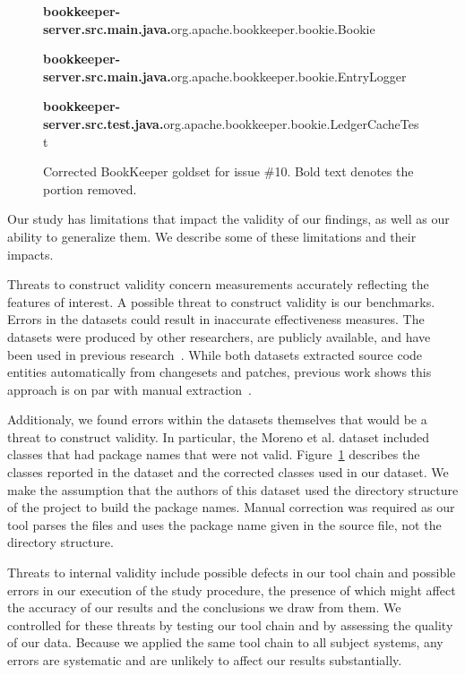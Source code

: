 

\begin{figure}[t]
\footnotesize

{\bf bookkeeper-server.src.main.java.}org.apache.bookkeeper.bookie.Bookie

{\bf bookkeeper-server.src.main.java.}org.apache.bookkeeper.bookie.EntryLogger

{\bf bookkeeper-server.src.test.java.}org.apache.bookkeeper.bookie.LedgerCacheTest

\caption{Corrected BookKeeper goldset for issue \#10. Bold text denotes the portion removed.}
\label{fig:goldsetfix}
\vspace{-15pt}
\end{figure}


Our study has limitations that impact the validity of our findings,
as well as our ability to generalize them.
We describe some of these limitations and their impacts.

Threats to construct validity concern measurements accurately reflecting the features of interest.
A possible threat to construct validity is our benchmarks.
Errors in the datasets could result in inaccurate effectiveness measures.
The datasets were produced by other researchers, are publicly available,
and have been used in previous research~\cite{Dit-etal:2013, Revelle-etal:2010, Moreno-etal:2014}.
While both datasets extracted source code entities automatically from changesets and patches,
previous work shows this approach is on par with manual extraction~\cite{Corley-etal:2011}.

Additionaly, we found errors within the datasets themselves that would be a threat to construct validity.
In particular, the Moreno et al. dataset included classes that had package names that were not valid.
Figure~\ref{fig:goldsetfix} describes the classes reported in the dataset and the corrected classes used in our dataset.
We make the assumption that the authors of this dataset used the directory structure of the project to build the package names.
Manual correction was required as our tool parses the files and uses the package name given in the source file, not the directory structure.

Threats to internal validity include possible defects in our tool chain and possible errors
in our execution of the study procedure,
the presence of which might affect the accuracy of our results and the conclusions we draw from them.
We controlled for these threats by testing our tool chain and by assessing the quality of our data.
Because we applied the same tool chain to all subject systems, any errors are systematic and are unlikely
to affect our results substantially.

